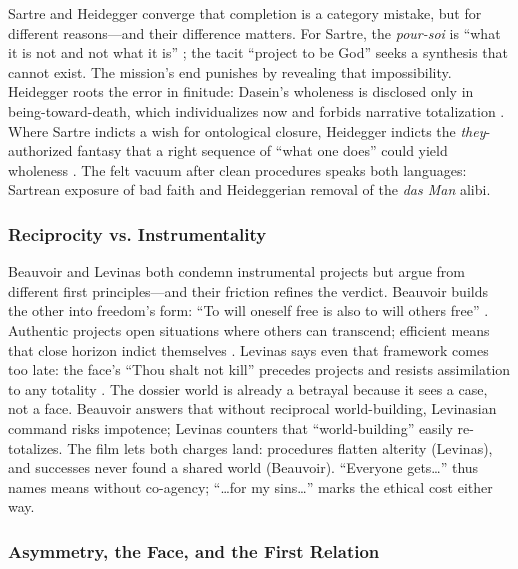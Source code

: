 Sartre and Heidegger converge that completion is a category mistake, but for different
reasons---and their difference matters. For Sartre, the \emph{pour-soi} is ``what it is not and
not what it is'' \parencite[pp.~100--110]{SartreBN2003}; the tacit ``project to be God''
\parencite[pp.~586--604]{SartreBN2003} seeks a synthesis that cannot exist. The mission's end
punishes by revealing that impossibility. Heidegger roots the error in finitude: Dasein's wholeness
is disclosed only in being-toward-death, which individualizes now and forbids narrative
totalization \parencite[pp.~294--307]{HeideggerBT1962}. Where Sartre indicts a wish for
ontological closure, Heidegger indicts the \emph{they}-authorized fantasy that a right sequence of
``what one does'' could yield wholeness \parencite[pp.~149--168]{HeideggerBT1962}. The felt vacuum
after clean procedures speaks both languages: Sartrean exposure of bad faith and Heideggerian
removal of the \emph{das Man} alibi.

\subsubsection*{Reciprocity vs. Instrumentality}
\label{sssec:reciprocity-vs-instrumentality}

Beauvoir and Levinas both condemn instrumental projects but argue from different first
principles---and their friction refines the verdict. Beauvoir builds the other into freedom's form:
``To will oneself free is also to will others free'' \parencite[p.~73]{Beauvoir1976}. Authentic
projects open situations where others can transcend; efficient means that close horizon indict
themselves \parencite[pp.~134--147, 157--161, 164--173]{Beauvoir1976}. Levinas says even that
framework comes too late: the face's ``Thou shalt not kill'' precedes projects and resists
assimilation to any totality \parencite[pp.~21--24, 33, 199]{LevinasTI1969}. The dossier world is
already a betrayal because it sees a case, not a face. Beauvoir answers that without reciprocal
world-building, Levinasian command risks impotence; Levinas counters that ``world-building'' easily
re-totalizes. The film lets both charges land: procedures flatten alterity (Levinas), and successes
never found a shared world (Beauvoir). ``Everyone gets\ldots'' thus names means without co-agency;
``\ldots for my sins\ldots'' marks the ethical cost either way.

\subsubsection*{Asymmetry, the Face, and the First Relation}
\label{sssec:asymmetry-the-face-and-the-first-relation}

